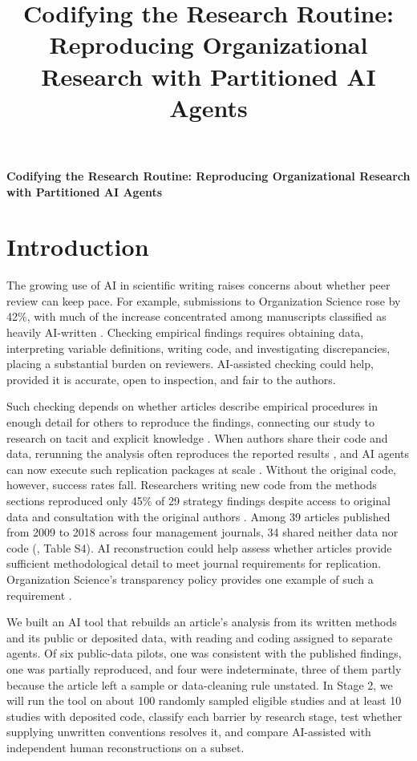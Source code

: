 \documentclass[12pt]{article}
\title{\vspace{-2em}Codifying the Research Routine: Reproducing Organizational Research with Partitioned AI Agents\vspace{-1.5em}}
\author{}
\date{}
\begin{document}
\thispagestyle{empty}
{\singlespacing\centering\Large\bfseries
Codifying the Research Routine: Reproducing Organizational Research with Partitioned AI Agents\par}
\vspace{10pt}
\section{Introduction}\label{sec:intro}

The growing use of AI in scientific writing raises concerns about whether peer review can keep pace. For example, submissions to Organization Science rose by 42\%, with much of the increase concentrated among manuscripts classified as heavily AI-written \citep{gartenberg2026}. Checking empirical findings requires obtaining data, interpreting variable definitions, writing code, and investigating discrepancies, placing a substantial burden on reviewers. AI-assisted checking could help, provided it is accurate, open to inspection, and fair to the authors.

Such checking depends on whether articles describe empirical procedures in enough detail for others to reproduce the findings, connecting our study to research on tacit and explicit knowledge \citep{polanyi1966,nonaka1994}. When authors share their code and data, rerunning the analysis often reproduces the reported results \citep{fisar2024}, and AI agents can now execute such replication packages at scale \citep{schwartz2026}. Without the original code, however, success rates fall. Researchers writing new code from the methods sections reproduced only 45\% of 29 strategy findings despite access to original data and consultation with the original authors \citep{delios2022}.  Among 39 articles published from 2009 to 2018 across four management journals, 34 shared neither data nor code (\citealp{miske2026}, Table S4). AI reconstruction could help assess whether articles provide sufficient methodological detail to meet journal requirements for replication. Organization Science's transparency policy provides one example of such a requirement \citep{orgsci2025transparency}.

We built an AI tool that rebuilds an article's analysis from its written methods and its public or deposited data, with reading and coding assigned to separate agents. Of six public-data pilots, one was consistent with the published findings, one was partially reproduced, and four were indeterminate, three of them partly because the article left a sample or data-cleaning rule unstated. In Stage 2, we will run the tool on about 100 randomly sampled eligible studies and at least 10 studies with deposited code, classify each barrier by research stage, test whether supplying unwritten conventions resolves it, and compare AI-assisted with independent human reconstructions on a subset.
\end{document}
